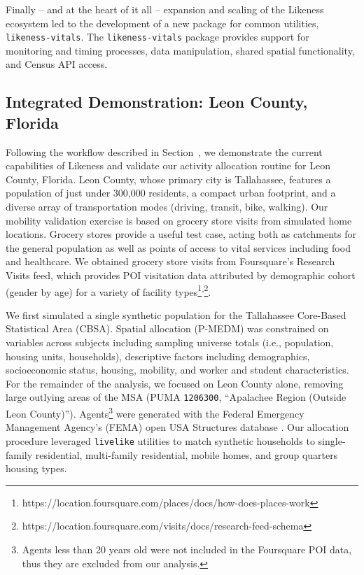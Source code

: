 Finally -- and at the heart of it all -- expansion and scaling of the Likeness ecosystem led to the development of a new package for common utilities, \texttt{likeness-vitals}. The \texttt{likeness-vitals} package provides support for monitoring and timing processes, data manipulation, shared spatial functionality, and Census API access.

\subsection{Integrated Demonstration: Leon County, Florida} \label{section:LCFL}

Following the workflow described in Section~, we demonstrate the current capabilities of Likeness and validate our activity allocation routine for Leon County, Florida. Leon County, whose primary city is Tallahassee, features a population of just under 300,000 residents, a compact urban footprint, and a diverse array of transportation modes (driving, transit, bike, walking). Our mobility validation exercise is based on grocery store visits from simulated home locations. Grocery stores provide a useful test case, acting both as catchments for the general population as well as points of access to vital services including food and healthcare. We obtained grocery store visits from Foursquare's Research Visits feed, which provides POI visitation data attributed by demographic cohort (gender by age) for a variety of facility types\footnote{https://location.foursquare.com/places/docs/how-does-places-work}\textsuperscript{,}\footnote{https://location.foursquare.com/visits/docs/research-feed-schema}.

We first simulated a single synthetic population for the Tallahassee Core-Based Statistical Area (CBSA). Spatial allocation (P-MEDM) was constrained on variables across subjects including sampling universe totals (i.e., population, housing units, households), descriptive factors including demographics, socioeconomic status, housing, mobility, and worker and student characteristics. For the remainder of the analysis, we focused on Leon County alone, removing large outlying areas of the MSA (PUMA \texttt{1206300}, ``Apalachee Region (Outside Leon County)''). Agents\footnote{Agents less than 20 years old were not included in the Foursquare POI data, thus they are excluded from our analysis.} were generated with the Federal Emergency Management Agency's (FEMA) open USA Structures database \cite{yang2018building, usa_struct_2022}. Our allocation procedure leveraged \texttt{livelike} utilities to match synthetic households to single-family residential, multi-family residential, mobile homes, and group quarters housing types.

